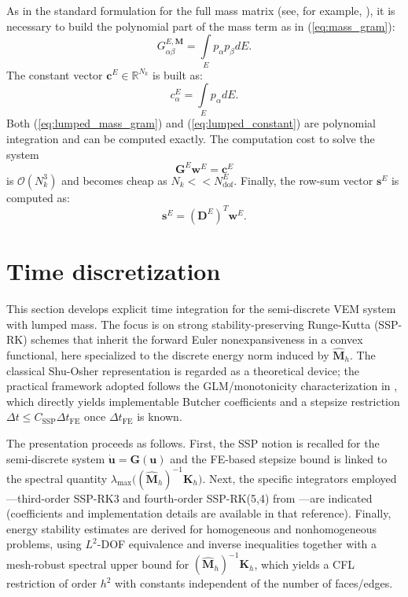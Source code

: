 \documentclass{article}
\renewcommand{\u}{\mathbf{u}}
\newcommand{\K}{\mathbf{K}_h}
\newcommand{\M}{\hat{\mathbf{M}}_h}
\newcommand{\integral}[1]{\int \limits_{#1}}
\newcommand{\numdofs}{N^E_{\text{dof}}}
\begin{document}
As in the standard formulation for the full mass matrix (see, for example, \cite{vacca2015parabolic}), it is necessary to build the polynomial part of the mass term as in (\ref{eq:mass_gram}):
\begin{equation}\label{eq:lumped_mass_gram}
    G^{E,\mathbf{M}}_{\alpha \beta} = \integral{E} p_\alpha p_\beta dE.
\end{equation}
The constant vector $\mathbf{c}^E \in \mathbb{R}^{N_k}$ is built as:
\begin{equation}\label{eq:lumped_constant}
    c^E_\alpha = \integral{E} p_\alpha dE.
\end{equation}
Both (\ref{eq:lumped_mass_gram}) and (\ref{eq:lumped_constant}) are polynomial integration and can be computed exactly. The computation cost to solve the system
\begin{equation}
    \nonumber
    \mathbf{G}^E \mathbf{w}^E = \mathbf{c}^E
\end{equation}
is $\mathcal{O}(N_k^3)$ and becomes cheap as $N_k << \numdofs$. Finally, the row-sum vector $\mathbf{s}^E$ is computed as:
\begin{equation}
    \nonumber
    \mathbf{s}^E = \left( \mathbf{D}^E \right)^T \mathbf{w}^E.
\end{equation}

\section{Time discretization}
\label{sec:estimates}

This section develops explicit time integration for the semi-discrete VEM system with lumped mass. The focus is on strong stability-preserving Runge-Kutta (SSP-RK) schemes that inherit the forward Euler nonexpansiveness in a convex functional, here specialized to the discrete energy norm induced by $\M$. The classical Shu-Osher representation is regarded as a theoretical device; the practical framework adopted follows the GLM/monotonicity characterization in \cite{izzo2022ssp}, which directly yields implementable Butcher coefficients and a stepsize restriction $\Delta t \le C_{\mathrm{SSP}}\Delta t_{\mathrm{FE}}$ once $\Delta t_{\mathrm{FE}}$ is known.

The presentation proceeds as follows. First, the SSP notion is recalled for the semi-discrete system $\dot{\u}=\mathbf{G}(\u)$ and the FE-based stepsize bound is linked to the spectral quantity $\lambda_{\max}\!\big((\M)^{-1}\K\big)$. Next, the specific integrators employed—third-order SSP-RK3 and fourth-order SSP-RK(5,4) from \cite{izzo2022ssp}—are indicated (coefficients and implementation details are available in that reference). Finally, energy stability estimates are derived for homogeneous and nonhomogeneous problems, using $L^2$-DOF equivalence and inverse inequalities together with a mesh-robust spectral upper bound for $(\hat{\mathbf{M}}_h)^{-1}\mathbf{K}_h$, which yields a CFL restriction of order $h^2$ with constants independent of the number of faces/edges.
\end{document}
